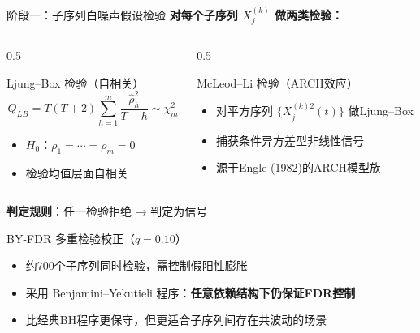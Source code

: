 \documentclass{beamer}
\begin{document}
\begin{frame}{阶段一：子序列白噪声假设检验}
    \textbf{对每个子序列 $X^{(k)}_j$ 做两类检验：}
    
    \begin{columns}[T]
        \begin{column}{0.5\textwidth}
            \begin{block}{Ljung--Box 检验（自相关）}
                \vspace{-0.3cm}
                \begin{equation*}
                    Q_{LB} = T(T+2)\sum_{h=1}^{m}\frac{\hat{\rho}_h^2}{T-h} \sim \chi^2_m
                \end{equation*}
                \vspace{-0.3cm}
                \begin{itemize}
                    \item $H_0$：$\rho_1 = \cdots = \rho_m = 0$
                    \item 检验均值层面自相关
                \end{itemize}
            \end{block}
        \end{column}
        \begin{column}{0.5\textwidth}
            \begin{block}{McLeod--Li 检验（ARCH效应）}
                \vspace{-0.3cm}
                \begin{itemize}
                    \item 对平方序列 $\{X^{(k)2}_j(t)\}$ 做Ljung--Box
                    \item 捕获条件异方差型非线性信号
                    \item 源于Engle (1982)的ARCH模型族
                \end{itemize}
            \end{block}
        \end{column}
    \end{columns}
    
    \vspace{0.2cm}
    \textbf{判定规则}：任一检验拒绝 → 判定为信号
    
    \vspace{0.2cm}
    \begin{block}{BY-FDR 多重检验校正（$q=0.10$）}
        \begin{itemize}
            \item 约700个子序列同时检验，需控制假阳性膨胀
            \item 采用 Benjamini--Yekutieli 程序：\textbf{任意依赖结构下仍保证FDR控制}
            \item 比经典BH程序更保守，但更适合子序列间存在共波动的场景
        \end{itemize}
    \end{block}
\end{frame}
\end{document}
